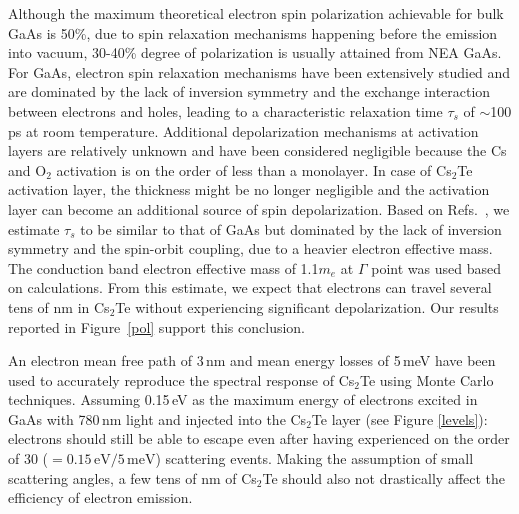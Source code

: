 Although the maximum theoretical electron spin polarization achievable for bulk GaAs is 50\%, due to spin relaxation mechanisms happening before the emission into vacuum, 30-40\% degree of polarization is usually attained from NEA GaAs. For GaAs, electron spin relaxation mechanisms have been extensively studied and are dominated by the lack of inversion symmetry and the exchange interaction between electrons and holes, leading to a characteristic relaxation time $\tau_s$ of $\sim$100 ps at room temperature.\cite{fishman1977_SpinRelaxationPhotoelectrons,zutic2004_SpintronicsFundamentalsApplications,song2002_SpinRelaxationConduction}
Additional depolarization mechanisms at activation layers are relatively unknown and have been considered negligible because the Cs and O$_2$ activation is on the order of less than a monolayer. In case of Cs$_2$Te activation layer, the thickness might be no longer negligible and the activation layer can become an additional source of spin depolarization.
Based on Refs.~\cite{zutic2004_SpintronicsFundamentalsApplications,song2002_SpinRelaxationConduction}, we estimate $\tau_s$ to be similar to that of GaAs but dominated by the lack of inversion symmetry and the spin-orbit coupling, due to a heavier electron effective mass. The conduction band electron effective mass of 1.1$m_e$ at $\Gamma$ point was used based on calculations.\cite{terdik2012_AnomalousWorkFunction} From this estimate, we expect that electrons can travel several tens of nm in Cs$_2$Te without experiencing significant depolarization. Our results reported in Figure~\ref{pol} support this conclusion.

An electron mean free path of 3\,nm and mean energy losses of 5\,meV have been used to accurately reproduce the spectral response of Cs$_2$Te using Monte Carlo techniques.\cite{ferrini_MONTECARLOSIMULATION} Assuming 0.15\,eV as the maximum energy of electrons excited in GaAs with 780\,nm light and injected into the Cs$_2$Te layer (see Figure \ref{levels}): electrons should still be able to escape even after having experienced on the order of 30 ($=0.15\,\mathrm{eV}/5\,\mathrm{meV}$) scattering events. Making the assumption of small scattering angles,\cite{jacoboni1989_MonteCarloMethod} a few tens of nm of Cs$_2$Te should also not drastically affect the efficiency of electron emission. 

